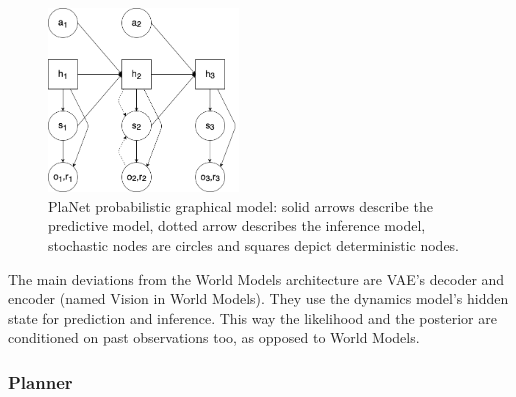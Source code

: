 \begin{figure}[H]
\includegraphics[width=0.45\textwidth,keepaspectratio]{figures/PlaNet/prob_graph_model.png}
\caption[World Models probabilistic graphical model]{PlaNet probabilistic graphical model: solid arrows describe the predictive model, dotted arrow describes the inference model, stochastic nodes are circles and squares depict deterministic nodes.}
\label{Fig.PlaNetPGM}
\end{figure}

The main deviations from the World Models architecture are VAE's decoder and encoder (named Vision in World Models). They use the dynamics model's hidden state for prediction and inference. This way the likelihood and the posterior are conditioned on past observations too, as opposed to World Models.

\subsubsection{Planner}


